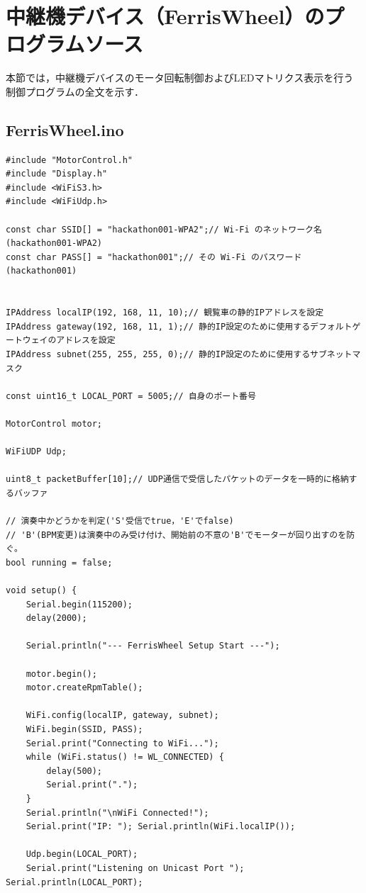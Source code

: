 \section{中継機デバイス（FerrisWheel）のプログラムソース}
\label{sec:apndx_display}
本節では，中継機デバイスのモータ回転制御およびLEDマトリクス表示を行う制御プログラムの全文を示す．

\subsection{FerrisWheel.ino}
\begin{lstlisting}[caption={FerrisWheel.ino}, label={lst:disp_ino}]
#include "MotorControl.h"
#include "Display.h"
#include <WiFiS3.h>
#include <WiFiUdp.h>

const char SSID[] = "hackathon001-WPA2";// Wi-Fi のネットワーク名(hackathon001-WPA2)
const char PASS[] = "hackathon001";// その Wi-Fi のパスワード(hackathon001)


IPAddress localIP(192, 168, 11, 10);// 観覧車の静的IPアドレスを設定
IPAddress gateway(192, 168, 11, 1);// 静的IP設定のために使用するデフォルトゲートウェイのアドレスを設定
IPAddress subnet(255, 255, 255, 0);// 静的IP設定のために使用するサブネットマスク

const uint16_t LOCAL_PORT = 5005;// 自身のポート番号

MotorControl motor;

WiFiUDP Udp;

uint8_t packetBuffer[10];// UDP通信で受信したパケットのデータを一時的に格納するバッファ

// 演奏中かどうかを判定('S'受信でtrue，'E'でfalse)
// 'B'(BPM変更)は演奏中のみ受け付け、開始前の不意の'B'でモーターが回り出すのを防ぐ。
bool running = false;

void setup() {
    Serial.begin(115200);
    delay(2000);

    Serial.println("--- FerrisWheel Setup Start ---");

    motor.begin();
    motor.createRpmTable();

    WiFi.config(localIP, gateway, subnet);
    WiFi.begin(SSID, PASS);
    Serial.print("Connecting to WiFi...");
    while (WiFi.status() != WL_CONNECTED) {
        delay(500);
        Serial.print(".");
    }
    Serial.println("\nWiFi Connected!");
    Serial.print("IP: "); Serial.println(WiFi.localIP());

    Udp.begin(LOCAL_PORT);
    Serial.print("Listening on Unicast Port "); Serial.println(LOCAL_PORT);


\end{lstlisting}
